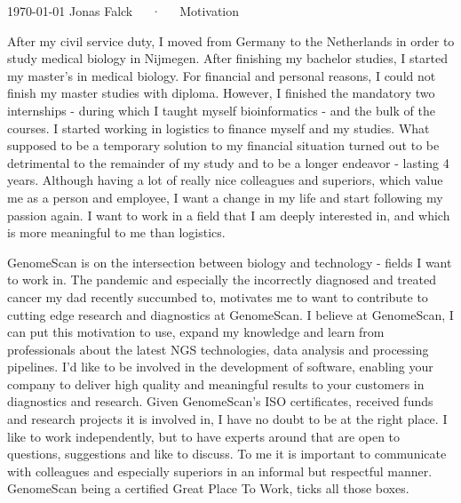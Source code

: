 \documentclass[11pt, a4paper]{awesome-cv}
\begin{document}
\makecvheader[R]

\makecvfooter
  {\today}
  {Jonas Falck~~~·~~~Motivation}
  {}

\makelettertitle

\begin{cvletter}

After my civil service duty, I moved from Germany to the Netherlands in order to study medical biology in Nijmegen. 
After finishing my bachelor studies, I started my master's in medical biology.
For financial and personal reasons, I could not finish my master studies with diploma.
However, I finished the mandatory two internships - during which I taught myself bioinformatics - and the bulk of the courses.
I started working in logistics to finance myself and my studies.
What supposed to be a temporary solution to my financial situation turned out to be detrimental to the remainder of my study and to be a longer endeavor - lasting 4 years.
Although having a lot of really nice colleagues and superiors, which value me as a person and employee, I want a change in my life and start following my passion again.
I want to work in a field that I am deeply interested in, and which is more meaningful to me than logistics.

GenomeScan is on the intersection between biology and technology - fields I want to work in.
The pandemic and especially the incorrectly diagnosed and treated cancer my dad recently succumbed to, motivates me to want to contribute to cutting edge research and diagnostics at GenomeScan.
I believe at GenomeScan, I can put this motivation to use, expand my knowledge and learn from professionals about the latest NGS technologies, data analysis and processing pipelines.
I'd like to be involved in the development of software, enabling your company to deliver high quality and meaningful results to your customers in diagnostics and research.
Given GenomeScan's ISO certificates, received funds and research projects it is involved in, I have no doubt to be at the right place.
I like to work independently, but to have experts around that are open to questions, suggestions and like to discuss.
To me it is important to communicate with colleagues and especially superiors in an informal but respectful manner.
GenomeScan being a certified Great Place To Work, ticks all those boxes.


\end{cvletter}
\end{document}
